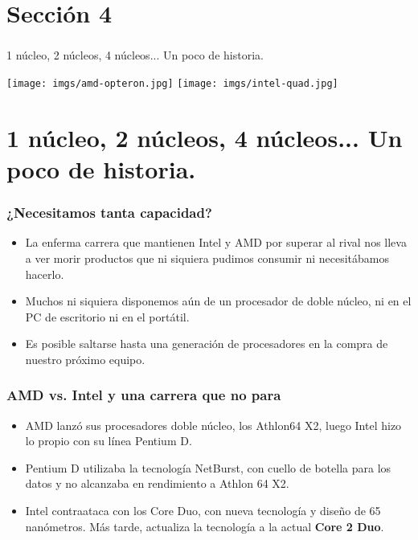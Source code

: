 \section*{Sección 4}
\frame
{
\frametitle{}
\begin{center}
\begin{huge}1 núcleo, 2 núcleos, 4 núcleos... Un poco \hspace*{1.5cm}de historia.\newline\newline
\end{huge}
\texttt{[image: imgs/amd-opteron.jpg]}\hspace*{1cm}
\texttt{[image: imgs/intel-quad.jpg]}
\end{center}
}

\section{1 núcleo, 2 núcleos, 4 núcleos... Un poco de historia.}
\frame
{
\frametitle{¿Necesitamos tanta capacidad?}
\begin{itemize}
\item La enferma carrera que mantienen Intel y AMD por superar al rival nos lleva a ver morir productos que ni siquiera pudimos consumir ni necesitábamos hacerlo.
\item Muchos ni siquiera disponemos aún de un procesador de doble núcleo, ni en el PC de escritorio ni en el portátil.
\item Es posible saltarse hasta una generación de procesadores en la compra de nuestro próximo equipo.
\end{itemize}
}

\frame
{
\frametitle{AMD vs. Intel y una carrera que no para}
\begin{itemize}
\item AMD lanzó sus procesadores doble núcleo, los Athlon64 X2, luego Intel hizo lo propio con su línea Pentium D.
\item Pentium D utilizaba la tecnología NetBurst, con cuello de botella para los datos y no alcanzaba en rendimiento a Athlon 64 X2.
\item Intel contraataca con los Core Duo, con nueva tecnología y diseño de 65 nanómetros. Más tarde, actualiza la tecnología a la actual \textbf{Core 2 Duo}.
\end{itemize}
}

